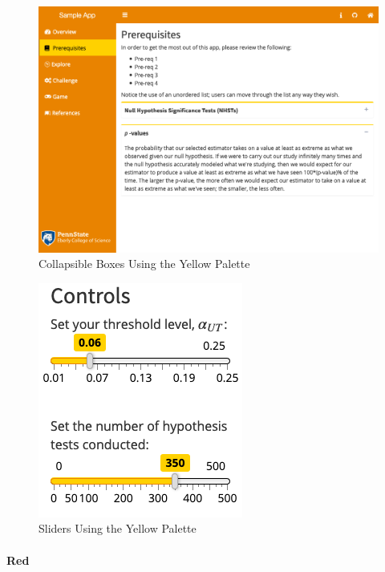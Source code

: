 \documentclass[]{book}
\let\oldparagraph\paragraph
\renewcommand{\paragraph}[1]{\oldparagraph{#1}\mbox{}}
\begin{document}
\begin{figure}

{\centering \includegraphics[width=14in]{images/yellowCollapse} 

}

\caption{Collapsible Boxes Using the Yellow Palette}\label{fig:yellowAction2}
\end{figure}

\begin{figure}

{\centering \includegraphics{images/yellowSliders} 

}

\caption{Sliders Using the Yellow Palette}\label{fig:yellowAction3}
\end{figure}

\hypertarget{red}{%
\paragraph{Red}\label{red}}
\end{document}
